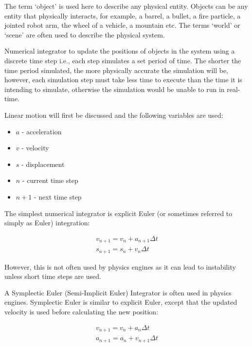The term `object' is used here to describe any physical entity. Objects can be any entity that physically interacts, for example, a barrel, a bullet, a fire particle, a jointed robot arm, the wheel of a vehicle, a mountain etc. The terms `world' or `scene' are often used to describe the physical system.

Numerical integrator to update the positions of objects in the system using a discrete time step i.e., each step simulates a set period of time. The shorter the time period simulated, the more physically accurate the simulation will be, however, each simulation step must take less time to execute than the time it is intending to simulate, otherwise the simulation would be unable to run in real-time.

Linear motion will first be discussed and the following variables are used:
\begin{itemize}
	\item $a$ - acceleration
	\item $v$ - velocity
	\item $s$ - displacement
	\item $n$ - current time step
	\item $n+1$ - next time step
\end{itemize}

The simplest numerical integrator is explicit Euler (or sometimes referred to simply as Euler) integration:

\begin{equation}
\begin{split}
	v_{n+1}=v_n+a_{n+1}{\Delta}t\\
	s_{n+1}=s_n+v_{n}{\Delta}t
\end{split}
\end{equation}

However, this is not often used by physics engines as it can lead to instability unless short time steps are used.

A Symplectic Euler (Semi-Implicit Euler) Integrator is often used in physics engines. Symplectic Euler is similar to explicit Euler, except that the updated velocity is used before calculating the new position:

\begin{equation}
\begin{split}
	v_{n+1}=v_n+a_n{\Delta}t\\
	a_{n+1}=a_n+v_{n+1}{\Delta}t
\end{split}
\end{equation}

